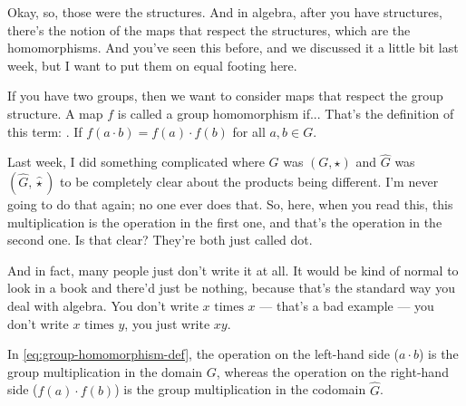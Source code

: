 \begin{speech}[00:07:18 - 00:09:02]
Okay, so, those were the structures. And in algebra, after you have structures, there's the notion of the maps that respect the structures, which are the homomorphisms. And you've seen this before, and we discussed it a little bit last week, but I want to put them on equal footing here.

If you have two groups,  then we want to consider maps that respect the group structure. A map $f$ is called a group homomorphism  if... That's the definition of this term: . If $f(a \cdot b) = f(a) \cdot f(b)$  for all $a, b \in G$. 

Last week, I did something complicated where $G$ was $(G, \star)$ and $\hat{G}$ was $(\hat{G}, \hat{\star})$ to be completely clear about the products being different. I'm never going to do that again; no one ever does that. So, here, when you read this, this multiplication is the operation in the first one, and that's the operation in the second one. Is that clear? They're both just called dot.

And in fact, many people just don't write it at all. It would be kind of normal to look in a book and there'd just be nothing, because that's the standard way you deal with algebra. You don't write $x \text{ times } x$ --- that's a bad example --- you don't write $x \text{ times } y$, you just write $xy$.
\end{speech}

\begin{content}

\begin{steps}
In \eqref{eq:group-homomorphism-def}, the operation on the left-hand side ($a \cdot b$) is the group multiplication in the domain $G$, whereas the operation on the right-hand side ($f(a) \cdot f(b)$) is the group multiplication in the codomain $\hat{G}$.
\end{steps}
\end{content}

